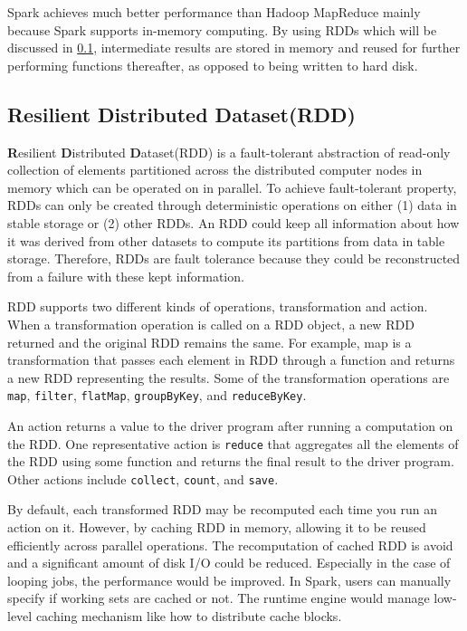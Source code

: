 Spark achieves much better performance than Hadoop MapReduce mainly because Spark supports in-memory computing. By using RDDs which will be discussed in \cref{subsection:rdd}, intermediate results are stored in memory and reused for further performing functions thereafter, as opposed to being written to hard disk. 

\subsection{ Resilient Distributed Dataset(RDD)}
\label{subsection:rdd}
\textbf{R}esilient \textbf{D}istributed \textbf{D}ataset(RDD) is a fault-tolerant abstraction of read-only collection of elements partitioned across the distributed computer nodes in memory which can be operated on in parallel. To achieve fault-tolerant property, RDDs can only be created through deterministic operations on either (1) data in stable storage or (2) other RDDs\cite{zaharia2012resilient}. An RDD could keep all information about how it was derived from other datasets to compute its partitions from data in table storage. Therefore, RDDs are fault tolerance because they could be reconstructed from a failure with these kept information. 

RDD supports two different kinds of operations, transformation and action. When a transformation operation is called on a RDD object, a new RDD returned and the original RDD remains the same. For example, map is a transformation that passes each element in RDD through a function and returns a new RDD representing the results. Some of the transformation operations are \texttt{map}, \texttt{filter}, \texttt{flatMap}, \texttt{groupByKey}, and \texttt{reduceByKey}. 

An action returns a value to the driver program after running a computation on the RDD. One representative action is \texttt{reduce} that aggregates all the elements of the RDD using some function and returns the final result to the driver program. Other actions include \texttt{collect}, \texttt{count}, and \texttt{save}.

By default, each transformed RDD may be recomputed each time you run an action on it. However, by caching RDD in memory, allowing it to be reused efficiently across parallel operations. The recomputation of cached RDD is avoid  and a significant amount of disk I/O could be reduced. Especially in the case of looping jobs, the performance would be improved. In Spark, users can manually specify if working sets are cached or not. The runtime engine would manage low-level caching mechanism like how to distribute cache blocks.

